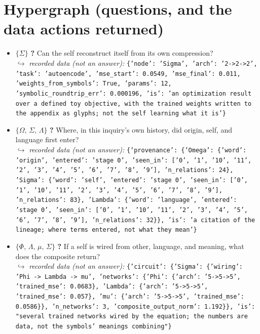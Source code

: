 \documentclass[11pt]{article}
\begin{document}
\section*{Hypergraph (questions, and the data actions returned)}
\begin{itemize}\item $\{\Sigma\}$ \quad \textbf{?} Can the self reconstruct itself from its own compression? \\ \hspace*{1em}$\hookrightarrow$ \emph{recorded data (not an answer):} \texttt{\{'node': 'Sigma', 'arch': '2->2->2', 'task': 'autoencode', 'mse\_start': 0.0549, 'mse\_final': 0.011, 'weights\_from\_symbols': True, 'params': 12, 'symbolic\_roundtrip\_err': 0.000196, 'is': 'an optimization result over a defined toy objective, with the trained weights written to the appendix as glyphs; not the self learning what it is'\}}
\item $\{\Omega,\,\Sigma,\,\Lambda\}$ \quad \textbf{?} Where, in this inquiry's own history, did origin, self, and language first enter? \\ \hspace*{1em}$\hookrightarrow$ \emph{recorded data (not an answer):} \texttt{\{'provenance': \{'Omega': \{'word': 'origin', 'entered': 'stage 0', 'seen\_in': ['0', '1', '10', '11', '2', '3', '4', '5', '6', '7', '8', '9'], 'n\_relations': 24\}, 'Sigma': \{'word': 'self', 'entered': 'stage 0', 'seen\_in': ['0', '1', '10', '11', '2', '3', '4', '5', '6', '7', '8', '9'], 'n\_relations': 83\}, 'Lambda': \{'word': 'language', 'entered': 'stage 0', 'seen\_in': ['0', '1', '10', '11', '2', '3', '4', '5', '6', '7', '8', '9'], 'n\_relations': 32\}\}, 'is': 'a citation of the lineage; where terms entered, not what they mean'\}}
\item $\{\Phi,\,\Lambda,\,\mu,\,\Sigma\}$ \quad \textbf{?} If a self is wired from other, language, and meaning, what does the composite return? \\ \hspace*{1em}$\hookrightarrow$ \emph{recorded data (not an answer):} \texttt{\{'circuit': \{'Sigma': \{'wiring': 'Phi -> Lambda -> mu', 'networks': \{'Phi': \{'arch': '5->5->5', 'trained\_mse': 0.0683\}, 'Lambda': \{'arch': '5->5->5', 'trained\_mse': 0.057\}, 'mu': \{'arch': '5->5->5', 'trained\_mse': 0.0586\}\}, 'n\_networks': 3, 'composite\_output\_norm': 1.192\}\}, 'is': "several trained networks wired by the equation; the numbers are data, not the symbols' meanings combining"\}}

\end{itemize}
\end{document}
